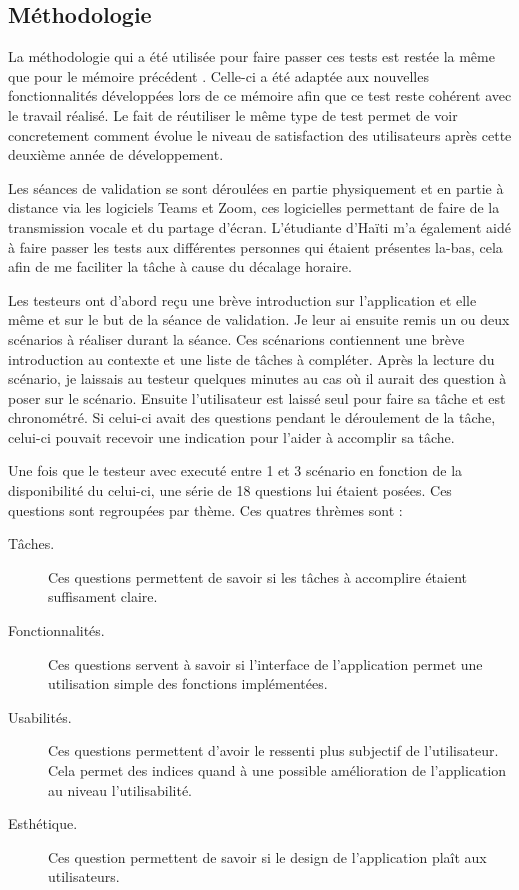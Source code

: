 \documentclass{EPL-master-thesis-covers-FR}
\begin{document}
			\subsection*{Méthodologie}
				La méthodologie qui a été utilisée pour faire passer ces tests est restée la même que pour le mémoire précédent \cite{ref:haitiwater}. Celle-ci a été adaptée aux nouvelles fonctionnalités développées lors de ce mémoire afin que ce test reste cohérent avec le travail réalisé. Le fait de réutiliser le même type de test permet de voir concretement comment évolue le niveau de satisfaction des utilisateurs après cette deuxième année de développement.
				
				Les séances de validation se sont déroulées en partie physiquement et en partie à distance via les logiciels Teams et Zoom, ces logicielles permettant de faire de la transmission vocale et du partage d'écran. L'étudiante d'Haïti m'a également aidé à faire passer les tests aux différentes personnes qui étaient présentes la-bas, cela afin de me faciliter la tâche à cause du décalage horaire.
				
				Les testeurs ont d'abord reçu une brève introduction sur l'application et elle même et sur le but de la séance de validation. Je leur ai ensuite remis un ou deux scénarios à réaliser durant la séance. Ces scénarions contiennent une brève introduction au contexte et une liste de tâches à compléter. Après la lecture du scénario, je laissais au testeur quelques minutes au cas où il aurait des question à poser sur le scénario. Ensuite l'utilisateur est laissé seul pour faire sa tâche et est chronométré. Si celui-ci avait des questions pendant le déroulement de la tâche, celui-ci pouvait recevoir une indication pour l'aider à accomplir sa tâche.
				
				Une fois que le testeur avec executé entre 1 et 3 scénario en fonction de la disponibilité du celui-ci, une série de 18 questions lui étaient posées. Ces questions sont regroupées par thème. Ces quatres thrèmes sont :
				\begin{description}
					\item[Tâches.] Ces questions permettent de savoir si les tâches à accomplire étaient suffisament claire.
					\item[Fonctionnalités.]  Ces questions servent à savoir si l'interface de l'application permet une utilisation simple des fonctions implémentées.
					\item[Usabilités.] Ces questions permettent d'avoir le ressenti plus subjectif de l'utilisateur. Cela permet des indices quand à une possible amélioration de l'application au niveau l'utilisabilité.
					\item[Esthétique.] Ces question permettent de savoir si le design de l'application plaît aux utilisateurs.
				\end{description}
\end{document}
